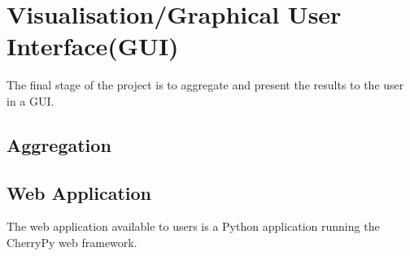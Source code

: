 \section[Visualisation]{Visualisation/Graphical User Interface(GUI)}
The final stage of the project is to aggregate and present the results to the user in a GUI.

\subsection{Aggregation}

\subsection{Web Application}
The web application available to users is a Python application running the CherryPy web framework.

